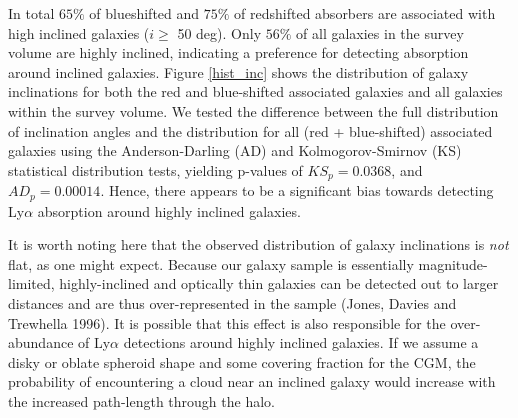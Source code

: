 \documentclass[iop]{emulateapj-rtx4}
\begin{document}
In total $65\%$ of blueshifted and $75\%$ of redshifted absorbers are associated with high inclined galaxies ($i \geq$ 50 deg). Only $56\%$ of all galaxies in the survey volume are highly inclined, indicating a preference for detecting absorption around inclined galaxies. Figure \ref{hist_inc} shows the distribution of galaxy inclinations for both the red and blue-shifted associated galaxies and all galaxies within the survey volume. We tested the difference between the full distribution of inclination angles and the distribution for all (red + blue-shifted) associated galaxies using the Anderson-Darling (AD) and Kolmogorov-Smirnov (KS) statistical distribution tests, yielding p-values of $KS_{p} =0.0368$, and $AD_{p} = 0.00014$. Hence, there appears to be a significant bias towards detecting Ly$\alpha$ absorption around highly inclined galaxies. 

It is worth noting here that the observed distribution of galaxy inclinations is \emph{not} flat, as one might expect. Because our galaxy sample is essentially magnitude-limited, highly-inclined and optically thin galaxies can be detected out to larger distances and are thus over-represented in the sample (Jones, Davies and Trewhella 1996). It is possible that this effect is also responsible for the over-abundance of Ly$\alpha$ detections around highly inclined galaxies. If we assume a disky or oblate spheroid shape and some covering fraction for the CGM, the probability of encountering a cloud near an inclined galaxy would increase with the increased path-length through the halo. 



\end{document}

